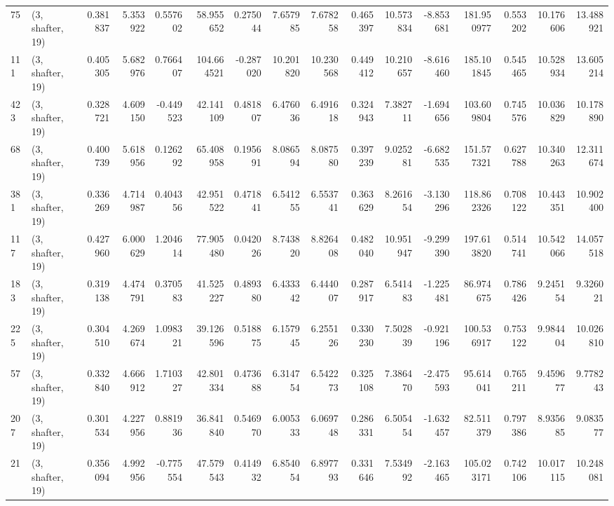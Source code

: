 \begin{tabular}{llrrrrrrrrrrrrrr}
75  &  (3, shafter, 19) &   0.381837 &   5.353922 &   0.557602 &    58.955652 &   0.275044 &   7.657985 &   7.678258 &  0.465397 &  10.573834 &  -8.853681 &   181.950977 &  0.553202 &  10.176606 &  13.488921 \\
111 &  (3, shafter, 19) &   0.405305 &   5.682976 &   0.766407 &   104.664521 &  -0.287020 &  10.201820 &  10.230568 &  0.449412 &  10.210657 &  -8.616460 &   185.101845 &  0.545465 &  10.528934 &  13.605214 \\
423 &  (3, shafter, 19) &   0.328721 &   4.609150 &  -0.449523 &    42.141109 &   0.481807 &   6.476036 &   6.491618 &  0.324943 &   7.382711 &  -1.694656 &   103.609804 &  0.745576 &  10.036829 &  10.178890 \\
68  &  (3, shafter, 19) &   0.400739 &   5.618956 &   0.126292 &    65.408958 &   0.195691 &   8.086594 &   8.087580 &  0.397239 &   9.025281 &  -6.682535 &   151.577321 &  0.627788 &  10.340263 &  12.311674 \\
381 &  (3, shafter, 19) &   0.336269 &   4.714987 &   0.404356 &    42.951522 &   0.471841 &   6.541255 &   6.553741 &  0.363629 &   8.261654 &  -3.130296 &   118.862326 &  0.708122 &  10.443351 &  10.902400 \\
117 &  (3, shafter, 19) &   0.427960 &   6.000629 &   1.204614 &    77.905480 &   0.042026 &   8.743820 &   8.826408 &  0.482040 &  10.951947 &  -9.299390 &   197.613820 &  0.514741 &  10.542066 &  14.057518 \\
183 &  (3, shafter, 19) &   0.319138 &   4.474791 &   0.370583 &    41.525227 &   0.489380 &   6.433342 &   6.444007 &  0.287917 &   6.541483 &  -1.225481 &    86.974675 &  0.786426 &   9.245154 &   9.326021 \\
225 &  (3, shafter, 19) &   0.304510 &   4.269674 &   1.098321 &    39.126596 &   0.518875 &   6.157945 &   6.255126 &  0.330230 &   7.502839 &  -0.921196 &   100.536917 &  0.753122 &   9.984404 &  10.026810 \\
57  &  (3, shafter, 19) &   0.332840 &   4.666912 &   1.710327 &    42.801334 &   0.473688 &   6.314754 &   6.542273 &  0.325108 &   7.386470 &  -2.475593 &    95.614041 &  0.765211 &   9.459677 &   9.778243 \\
207 &  (3, shafter, 19) &   0.301534 &   4.227956 &   0.881936 &    36.841840 &   0.546970 &   6.005333 &   6.069748 &  0.286331 &   6.505454 &  -1.632457 &    82.511379 &  0.797386 &   8.935685 &   9.083577 \\
21  &  (3, shafter, 19) &   0.356094 &   4.992956 &  -0.775554 &    47.579543 &   0.414932 &   6.854054 &   6.897793 &  0.331646 &   7.534992 &  -2.163465 &   105.023171 &  0.742106 &  10.017115 &  10.248081 \\

\end{tabular}
